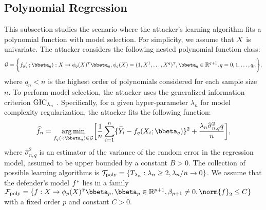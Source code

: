     \subsection{Polynomial Regression}\label{subsec:lr}
        This subsection studies the scenario where the attacker's learning algorithm fits a polynomial function with model selection. 
        For simplicity, we assume that $X$ is univariate. 
        The attacker considers the following nested polynomial function class:
        \begin{align*}
            \mathcal{G} = \biggl\{f_q(\cdot;\bbeta_q): X \to \phi_q(X)^\T \bbeta_q, \phi_q(X)=(1, X^{1},  \ldots, X^{q})^\T,  \bbeta_q \in \Real^{q+1}, q=0,1,\dots, q_n \biggr\},
        \end{align*}
        where $q_n<n$ is the highest order of polynomials considered for each sample size $n$.
        To perform model selection, the attacker uses the generalized information criterion $\textrm{GIC}_{\lambda_n}$ \citep[see, e.g., ][]{shao1997asymptotic, ding2018model}.
        Specifically, for a given hyper-parameter $\lambda_n$ for model complexity regularization, the attacker fits the following function:
        \begin{align*}
            \hat{f}_n = \argmin_{f_q(\cdot;\bbeta_q) \in \mathcal{G}}   \biggl[ \frac{1}{n}\sum_{i=1}^n \{\Y_i-f_q(X_i;\bbeta_q)\}^2 + \frac{ \lambda_n \hat{\sigma}_{n,q}^2 q}{n} \biggr],
        \end{align*}
        where $\hat{\sigma}_{n,q}^2$ is an estimator of the variance of the random error in the regression model, assumed to be upper bounded by a constant $B>0$. The collection of possible learning algorithms is $\mathcal{T}_{\textrm{poly}} = \{T_{\lambda_n}: \lambda_n \geq 2, \lambda_n / n \to 0\}$.
         We assume that the defender's model $f^*$ lies in a family $\fc_{\preg}=\{f: X \to \phi_p(X)^\T\bbeta_p, \bbeta_p \in \Real^{p+1}, \beta_{p+1} \neq 0, \norm{f}_2\leq C \}$ with a fixed order $p$ and constant $C>0$. 


